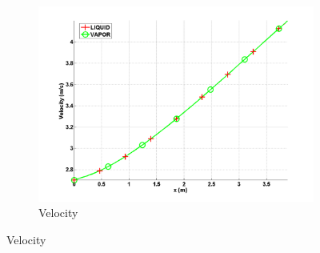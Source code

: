 \documentclass{anstrans}
\begin{document}
\begin{figure}[H]
        \begin{subfigure}[b]{0.495\textwidth}
                \centering
                \includegraphics[width=\textwidth]{plots/ANS_WINTER_2014_7Eqn_velocity.png}
                \caption{Velocity}
                \label{fig:velocity}
        \end{subfigure}
\end{figure}
%
\end{document}
